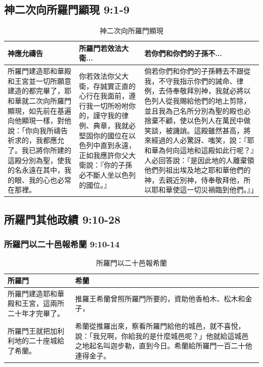 \subsection{神二次向所羅門顯現 9:1-9}
\begin{table}[H]
\vspace{-3mm}
\centering 
\begin{tabular}{p{4.75cm}|p{3.75cm}|p{8cm}}\hline\hline
神應允禱告&所羅門若效法大衛...&若你們和你們的子孫不...\\\hline\hline
所羅門建造耶和華殿和王宮並一切所願意建造的都完畢了，耶和華就二次向所羅門顯現，如先前在基遍向他顯現一樣，對他說：「你向我所禱告祈求的，我都應允了。我已將你所建的這殿分別為聖，使我的名永遠在其中，我的眼、我的心也必常在那裡。
&你若效法你父大衛，存誠實正直的心行在我面前，遵行我一切所吩咐你的，謹守我的律例、典章，我就必堅固你的國位在以色列中直到永遠，正如我應許你父大衛說：『你的子孫必不斷人坐以色列的國位。』 
&倘若你們和你們的子孫轉去不跟從我，不守我指示你們的誡命、律例，去侍奉敬拜別神，我就必將以色列人從我賜給他們的地上剪除，並且我為己名所分別為聖的殿也必捨棄不顧，使以色列人在萬民中做笑談，被譏誚。這殿雖然甚高，將來經過的人必驚訝、嗤笑，說：『耶和華為何向這地和這殿如此行呢？』人必回答說：『是因此地的人離棄領他們列祖出埃及地之耶和華他們的神，去親近別神，侍奉敬拜他，所以耶和華使這一切災禍臨到他們。』」\\\hline
\end{tabular}
\caption{神二次向所羅門顯現}
\end{table}


\subsection{所羅門其他政績 9:10-28}
\subsubsection{所羅門以二十邑報希蘭 9:10-14}
\begin{table}[H]
\vspace{-3mm}
\centering 
\begin{tabular}{p{8.2cm}|p{9.45cm}}\hline\hline
所羅門&希蘭\\\hline\hline
所羅門建造耶和華殿和王宮，這兩所二十年才完畢了。
&推羅王希蘭曾照所羅門所要的，資助他香柏木、松木和金子，\\\hline
所羅門王就把加利利地的二十座城給了希蘭。&希蘭從推羅出來，察看所羅門給他的城邑，就不喜悅，說：「我兄啊，你給我的是什麼城邑呢？」他就給這城邑之地起名叫迦步勒，直到今日。希蘭給所羅門一百二十他連得金子。\\\hline
\end{tabular}
\caption{所羅門以二十邑報希蘭}
\end{table}



